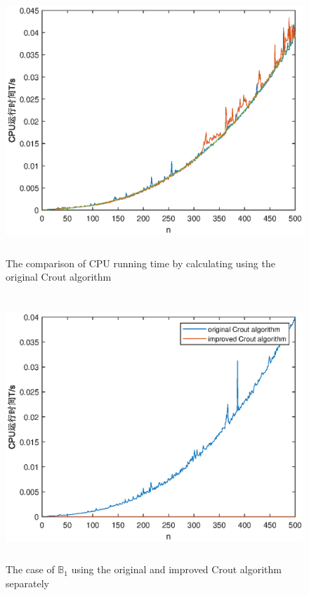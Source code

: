 \documentclass[UTF8,a4paper,10pt]{ctexart}
\begin{document}
\begin{figure}[ht]
    \centering
    \includegraphics[width=14cm,height=10cm]{1.2_original.eps}
    \caption{The comparison of CPU running time by calculating using the original Crout algorithm}
\end{figure}
\begin{figure}[ht]
    \centering
    \includegraphics[width=14cm,height=10cm]{1.2_B1_comparison.eps}
    \caption{The case of $\mathbb{B}_1$ using the original and improved Crout algorithm separately}
\end{figure}
\end{document}
